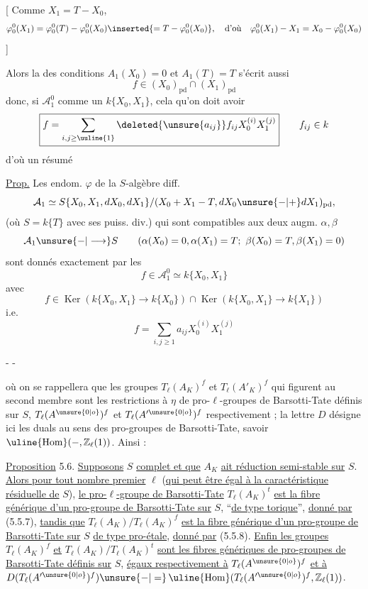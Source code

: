 [ Comme $X_1=T-X_0$, 
\[
\varphi_0^0(X_1)=\varphi_0^0(T)-\varphi_0^0(X_0)\inserted{=T-\varphi_0^0(X_0)},\quad\text{d'où}\quad\varphi_0^0(X_1)-X_1=X_0-\varphi_0^0(X_0)
\]
]

Alors la  des conditions $A_1(X_0)=0$ et $A_1(T)=T$ s'écrit aussi
\[
f\in(X_0)_{\mathrm{pd}}\cap(X_1)_{\mathrm{pd}}
\]
donc, si  $\mathcal A_1^0$ comme un  $k\{X_0,X_1\}$, cela  qu'on doit avoir
\[
\boxed{f=\sum_{i,j\ge\text{\uuline{1}}}\deleted{\unsure{a_{ij}}}f_{ij}X_0^{(i)}X_1^{(j)}}\qquad f_{ij}\in k
\]
d'où un résumé

\uline{Prop.} Les endom. $\varphi$ de la $S$-algèbre diff.
\[
\mathcal A_1\simeq S\{X_0,X_1,dX_0,dX_1\}/(X_0+X_1-T,dX_0\unsure{-|+}dX_1)_{\mathrm{pd}},
\]
(où $S=k\{T\}$ avec ses puiss. div.) qui sont compatibles aux deux augm. $\alpha,\beta$
\[
\mathcal A_1\unsure{-|\longrightarrow}S\qquad(\alpha(X_0)=0,\alpha(X_1)=T;\ \beta(X_0)=T,\beta(X_1)=0)
\]
sont donnés exactement par les 
\[
f\in\mathcal A_1^0\simeq k\{X_0,X_1\}
\]
avec
\[
f\in\operatorname{Ker}(k\{X_0,X_1\}\to k\{X_0\})\cap\operatorname{Ker}(k\{X_0,X_1\}\to k\{X_1\})
\]
i.e.
\[
\boxed{f=\sum_{i,j\ge1}a_{ij}X_0^{(i)}X_1^{(j)}}
\]

\begin{center}-  -\end{center}
\margin{$=$}
\margin{-}

où on se rappellera que les groupes $T_\ell(A_K)^f$ et $T_\ell(A'_K)^f$ qui figurent au second membre sont les restrictions à $\eta$ de pro-$\ell$-groupes de Barsotti-Tate définis sur $S$, $T_\ell(A^{\unsure{0|o}})^f$ et $T_\ell(A'^{\unsure{0|o}})^f$ respectivement ; la lettre $D$ désigne ici les duals au sens des pro-groupes de Barsotti-Tate, savoir $\operatorname{\uline{Hom}}(-,\mathbb Z_\ell(1))$. Ainsi :

\uline{Proposition} 5.6. \uline{Supposons} $S$ \uline{complet et que} $A_K$ \uline{ait réduction semi-stable sur} $S$. \uline{Alors pour tout nombre premier} $\ell$ (\uline{qui peut être égal à la caractéristique résiduelle de} $S$), \uline{le pro-}$\ell$\uline{-groupe de Barsotti-Tate} $T_\ell(A_K)^t$ \uline{est la fibre générique d'un pro-groupe de Barsotti-Tate sur} $S$, ``\uline{de type torique}'', \uline{donné par} (5.5.7), \uline{tandis que} $T_\ell(A_K)/T_\ell(A_K)^f$ \uline{est la fibre générique d'un pro-groupe de Barsotti-Tate sur} $S$ \uline{de type pro-étale}, \uline{donné par} (5.5.8). \uline{Enfin les groupes} $T_\ell(A_K)^f$ \uline{et} $T_\ell(A_K)/T_\ell(A_K)^t$ \uline{sont les fibres génériques de pro-groupes de Barsotti-Tate définis sur} $S$, \uline{égaux respectivement à} $T_\ell(A^{\unsure{0|o}})^f$ \uline{et à} $D(T_\ell(A'^{\unsure{0|o}})^f)\unsure{-|=}\operatorname{\uline{Hom}}(T_\ell(A'^{\unsure{0|o}})^f,\mathbb Z_\ell(1))$.

